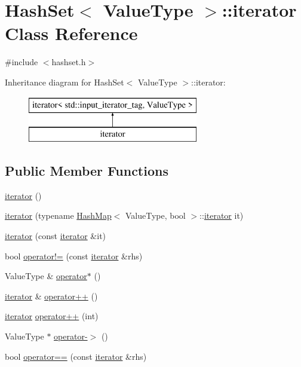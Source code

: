 \hypertarget{classHashSet_1_1iterator}{}\section{Hash\+Set$<$ Value\+Type $>$\+:\+:iterator Class Reference}
\label{classHashSet_1_1iterator}


{\ttfamily \#include $<$hashset.\+h$>$}

Inheritance diagram for Hash\+Set$<$ Value\+Type $>$\+:\+:iterator\+:\begin{figure}[H]
\begin{center}
\leavevmode
\includegraphics[height=2.000000cm]{classHashSet_1_1iterator}
\end{center}
\end{figure}
\subsection*{Public Member Functions}
\begin{DoxyCompactItemize}
\item 
\mbox{\hyperlink{classHashSet_1_1iterator_a67d652c2433cf9217ed2a1485092fdd1}{iterator}} ()
\item 
\mbox{\hyperlink{classHashSet_1_1iterator_a6de14de23a5a34012a09370c4d6804d6}{iterator}} (typename \mbox{\hyperlink{classHashMap}{Hash\+Map}}$<$ Value\+Type, bool $>$\+::\mbox{\hyperlink{classHashSet_1_1iterator}{iterator}} it)
\item 
\mbox{\hyperlink{classHashSet_1_1iterator_a698b7553261e7209d6c29fb55627dce4}{iterator}} (const \mbox{\hyperlink{classHashSet_1_1iterator}{iterator}} \&it)
\item 
bool \mbox{\hyperlink{classHashSet_1_1iterator_ae1983f2cb0df1f0cbe77ac29590e2e2b}{operator!=}} (const \mbox{\hyperlink{classHashSet_1_1iterator}{iterator}} \&rhs)
\item 
Value\+Type \& \mbox{\hyperlink{classHashSet_1_1iterator_ae7b3826e734ec2f7c79f5196fad83989}{operator$\ast$}} ()
\item 
\mbox{\hyperlink{classHashSet_1_1iterator}{iterator}} \& \mbox{\hyperlink{classHashSet_1_1iterator_af1b1c7856a59f34c7d3570f946a2ff00}{operator++}} ()
\item 
\mbox{\hyperlink{classHashSet_1_1iterator}{iterator}} \mbox{\hyperlink{classHashSet_1_1iterator_a538d230f8b52d2bc0950e26ce74ec239}{operator++}} (int)
\item 
Value\+Type $\ast$ \mbox{\hyperlink{classHashSet_1_1iterator_a5ba42337ec7bae549bb135838933b0ea}{operator-\/$>$}} ()
\item 
bool \mbox{\hyperlink{classHashSet_1_1iterator_a798956e7a65ef16c891d129b3ced0f9e}{operator==}} (const \mbox{\hyperlink{classHashSet_1_1iterator}{iterator}} \&rhs)
\end{DoxyCompactItemize}


